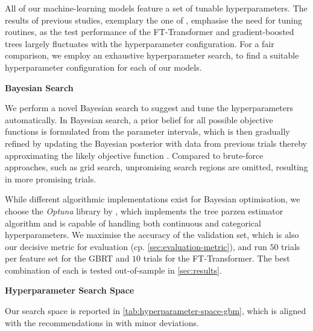 All of our machine-learning models feature a set of tunable hyperparameters. The results of previous studies, exemplary the one of \textcite[][5]{grinsztajnWhyTreebasedModels2022}, emphasise the need for tuning routines, as the test performance of the FT-Transformer and gradient-boosted trees largely fluctuates with the hyperparameter configuration. For a fair comparison, we employ an exhaustive hyperparameter search, to find a suitable hyperparameter configuration for each of our models.

\textbf{Bayesian Search}

We perform a novel Bayesian search to suggest and tune the hyperparameters automatically. In Bayesian search, a prior belief for all possible objective functions is formulated from the parameter intervals, which is then gradually refined by updating the Bayesian posterior with data from previous trials thereby approximating the likely objective function \autocite[][2]{shahriariTakingHumanOut2016}. Compared to brute-force approaches, such as grid search, unpromising search regions are omitted, resulting in more promising trials.

While different algorithmic implementations exist for Bayesian optimisation, we choose the \emph{Optuna} library by \textcite[][1--10]{akibaOptunaNextgenerationHyperparameter2019}, which implements the tree parzen estimator algorithm and is capable of handling both continuous and categorical hyperparameters. We maximise the accuracy of the validation set, which is also our decisive metric for evaluation (cp. \cref{sec:evaluation-metric}), and run $\num{50}$ trials per feature set for the \gls{GBRT} and $\num{10}$ trials for the FT-Transformer. The best combination of each is tested out-of-sample in \cref{sec:results}.

\textbf{Hyperparameter Search Space}

Our search space is reported in \cref{tab:hyperparameter-space-gbm}, which is aligned with the recommendations in \textcites[][20]{prokhorenkovaCatBoostUnbiasedBoosting2018}[][18]{gorishniyRevisitingDeepLearning2021}[][4]{rubachevRevisitingPretrainingObjectives2022} with minor deviations.

